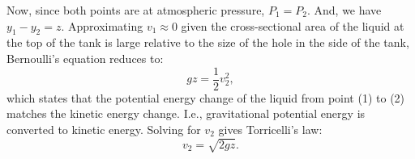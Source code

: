 \documentclass[a4paper,fleqn]{cas-sc}
\begin{document}
	Now, since both points are at atmospheric pressure, $P_1=P_2$. And, we have $y_1-y_2=z$. Approximating $v_1\approx 0$ given the cross-sectional area of the liquid at the top of the tank is large relative to the size of the hole in the side of the tank, Bernoulli's equation reduces to:
	\begin{equation}
	g z  = \frac{1}{2} v_2^2,
	\end{equation}
	which states that the potential energy change of the liquid from point (1) to (2) matches the kinetic energy change. I.e., gravitational potential energy is converted to kinetic energy. Solving for $v_2$ gives Torricelli's law:
	\begin{equation}
	v_2 = \sqrt{2gz}.
	\end{equation}





\end{document}
